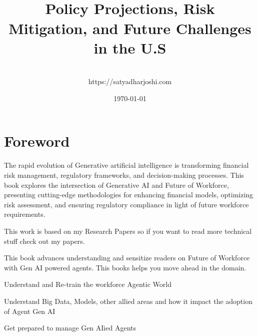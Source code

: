 \documentclass[a4paper,headinclude=on,footinclude=on,12pt,oneside]{scrbook}
\begin{document}
\title{\\\small{Policy Projections, Risk Mitigation, and Future Challenges in the U.S}}
\author{
    \\https://satyadharjoshi.com
}
\date{\today}

\maketitle
\tableofcontents

\listoffigures
{}


\chapter*{Foreword}

The rapid evolution of Generative artificial intelligence is transforming financial risk management, regulatory frameworks, and decision-making processes. 
This book explores the intersection of Generative AI and Future of Workforce, presenting cutting-edge methodologies for enhancing financial models, optimizing risk assessment, and ensuring regulatory compliance in light of future workforce requirements. 

This work is based on my Research Papers so if you want to read more technical stuff check out my papers. 



This book advances understanding and sensitize readers on Future of Workforce with Gen AI powered agents. This books helps you move ahead in the domain.

\begin{arrows}
	\item Understand and Re-train the workforce Agentic World
	\item Understand Big Data, Models, other allied areas and how it impact the adoption of Agent Gen AI
	\item Get prepared to manage Gen AIied Agents 
\end{arrows}

\end{document}
